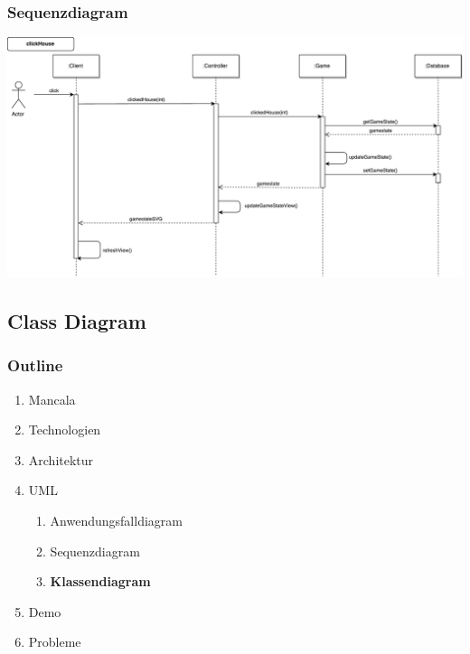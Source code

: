 \documentclass[
	10pt,
	t		%
]{beamer}
\begin{document}
\begin{frame}
\frametitle{Sequenzdiagram}
\begin{center}
\includegraphics[scale=0.32]{./../Diagrams/Sequence_clickHouse.pdf}
\end{center}
\end{frame}

\subsection{Class Diagram}
\begin{frame}
\frametitle{Outline}
\begin{enumerate}
\item Mancala
\item Technologien
\item Architektur
\item UML
\begin{enumerate}
\item Anwendungsfalldiagram
\item Sequenzdiagram
\item \textbf{Klassendiagram}
\end{enumerate}
\item Demo
\item Probleme
\end{enumerate}
\end{frame}
\end{document}
